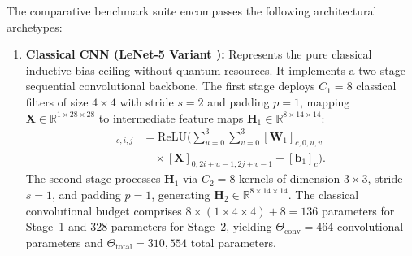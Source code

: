 \documentclass[pdflatex,sn-mathphys-num]{sn-jnl}%
\theoremstyle{thmstyleone}%
\theoremstyle{thmstyletwo}%
\theoremstyle{thmstylethree}%
\begin{document}
The comparative benchmark suite encompasses the following architectural archetypes:
\begin{enumerate}
    \item \textbf{Classical CNN (LeNet-5 Variant \cite{lecun1998gradient}):} Represents the pure classical inductive bias ceiling without quantum resources. It implements a two-stage sequential convolutional backbone. The first stage deploys $C_1 = 8$ classical filters of size $4 \times 4$ with stride $s=2$ and padding $p=1$, mapping $\mathbf{X} \in \mathbb{R}^{1 \times 28 \times 28}$ to intermediate feature maps $\mathbf{H}_1 \in \mathbb{R}^{8 \times 14 \times 14}$:
    \begin{align}
    [\mathbf{H}_1]_{c, i, j} &= \mathrm{ReLU}\Big( \sum_{u=0}^3 \sum_{v=0}^3 [\mathbf{W}_1]_{c, 0, u, v} \nonumber \\
    &\quad \times [\mathbf{X}]_{0, 2i+u-1, 2j+v-1} + [\mathbf{b}_1]_c \Big).
    \label{eq:lenet_stage1}
    \end{align}
    The second stage processes $\mathbf{H}_1$ via $C_2 = 8$ kernels of dimension $3 \times 3$, stride $s=1$, and padding $p=1$, generating $\mathbf{H}_2 \in \mathbb{R}^{8 \times 14 \times 14}$. The classical convolutional budget comprises $8 \times (1 \times 4 \times 4) + 8 = 136$ parameters for Stage~1 and $328$ parameters for Stage~2, yielding $\Theta_{\mathrm{conv}} = 464$ convolutional parameters and $\Theta_{\mathrm{total}} = 310{,}554$ total parameters.


\end{enumerate}
\end{document}

